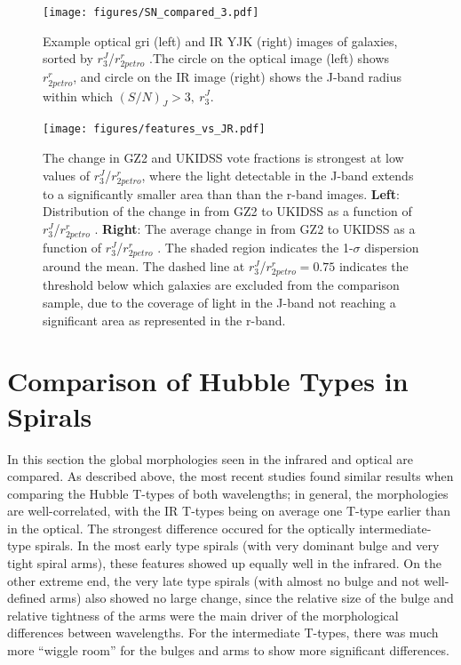 \begin{figure}
\centering
\texttt{[image: figures/SN\_compared\_3.pdf]}
\caption{Example optical gri (left) and IR YJK (right) images of galaxies, sorted by $r^{J}_{3}$/$r^{r}_{2petro}$ .The circle on the optical image (left) shows $r^{r}_{2petro}$, and circle on the IR image (right) shows the J-band radius within which $(S/N)_{J}>3,~r^{J}_3$.}
\label{fig:sn_compared}
\end{figure}

\begin{figure}
\centering
\texttt{[image: figures/features\_vs\_JR.pdf]}
\caption{The change in GZ2 and UKIDSS vote fractions is strongest at low values of $r^{J}_{3}$/$r^{r}_{2petro}$, where the light detectable in the J-band extends to a significantly smaller area than than the r-band images. \textbf{Left}: Distribution of the change in \ffeatures{} from GZ2 to UKIDSS as a function of $r^{J}_{3}$/$r^{r}_{2petro}$ . \textbf{Right}: The average change in \ffeatures from GZ2 to UKIDSS as a function of $r^{J}_{3}$/$r^{r}_{2petro}$ . The shaded region indicates the 1-$\sigma$ dispersion around the mean. The dashed line at $r^{J}_{3}$/$r^{r}_{2petro} =0.75$ indicates the threshold below which galaxies are excluded from the comparison sample, due to the coverage of light in the J-band not reaching a significant area as represented in the r-band.}
\label{fig:features_vs_JR}
\end{figure}

\section{Comparison of Hubble Types in Spirals}
In this section the global morphologies seen in the infrared and optical are compared. As described above, the most recent studies found similar results when comparing the Hubble T-types of both wavelengths; in general, the morphologies are well-correlated, with the IR T-types being on average one T-type earlier than in the optical. The strongest difference occured for the optically intermediate-type spirals. In the most early type spirals (with very dominant bulge and very tight spiral arms), these features showed up equally well in the infrared. On the other extreme end, the very late type spirals (with almost no bulge and not well-defined arms) also showed no large change, since the relative size of the bulge and relative tightness of the arms were the main driver of the morphological differences between wavelengths. For the intermediate T-types, there was much more ``wiggle room'' for the bulges and arms to show more significant differences. 

